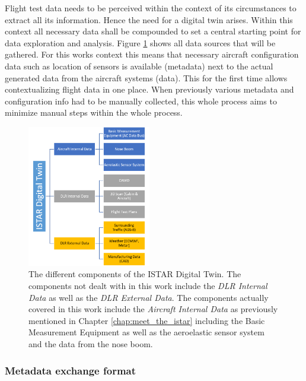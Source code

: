 Flight test data needs to be perceived within the context of its circumstances to extract all its information. Hence the need for a digital twin arises. Within this context all necessary data shall be compounded to set a central starting point for data exploration and analysis. Figure \ref{fig:digecat_data_sources} shows all data sources that will be gathered. For this works context this means that necessary aircraft configuration data such as location of sensors is available (metadata) next to the actual generated data from the aircraft systems (data). This for the first time allows contextualizing flight data in one place. When previously various metadata and configuration info had to be manually collected, this whole process aims to minimize manual steps within the whole process. \cite{arts_digital_2022}

\begin{figure}[h]
    \centering
    \includegraphics[width=0.48\textwidth]{03_figures/DIGECAT}
    \caption[Components of the Digital Twin]{The different components of the ISTAR Digital Twin. The components not dealt with in this work include the \textit{DLR Internal Data} as well as the \textit{DLR External Data}. The components actually covered in this work include the \textit{Aircraft Internal Data} as previously mentioned in Chapter \ref{chap:meet_the_istar} including the Basic Measurement Equipment as well as the aeroelastic sensor system and the data from the nose boom. \cite{arts_digital_2022}}
    \label{fig:digecat_data_sources}
\end{figure}

\subsubsection{Metadata exchange format}
\label{chap:2-metadata-format}

